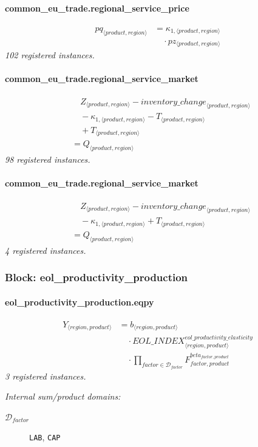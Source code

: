 \documentclass[11pt]{article}
\begin{document}
\paragraph{common\_eu\_trade.regional\_service\_price}
\begin{align*}
pq_{\langle product, region\rangle} &= \kappa_{1,\langle product, region\rangle}\\
&\quad {}\cdot pz_{\langle product, region\rangle}
\end{align*}
\noindent\emph{102 registered instances.}\par
\paragraph{common\_eu\_trade.regional\_service\_market}
\begin{align*}
&\quad Z_{\langle product, region\rangle} - {inventory\_change}_{\langle product, region\rangle}\\
&\quad {}- \kappa_{1,\langle product, region\rangle} - T_{\langle product, region\rangle}\\
&\quad {}+ T_{\langle product, region\rangle}\\
&= Q_{\langle product, region\rangle}
\end{align*}
\noindent\emph{98 registered instances.}\par
\paragraph{common\_eu\_trade.regional\_service\_market}
\begin{align*}
&\quad Z_{\langle product, region\rangle} - {inventory\_change}_{\langle product, region\rangle}\\
&\quad {}- \kappa_{1,\langle product, region\rangle} + T_{\langle product, region\rangle}\\
&= Q_{\langle product, region\rangle}
\end{align*}
\noindent\emph{4 registered instances.}\par
\subsubsection*{Block: eol\_productivity\_production}
\paragraph{eol\_productivity\_production.eqpy}
\begin{align*}
Y_{\langle region, product\rangle} &= b_{\langle region, product\rangle}\\
&\quad {}\cdot {EOL\_INDEX}_{\langle region, product\rangle}^{eol\_productivity\_elasticity}\\
&\quad {}\cdot \prod_{factor \in \mathcal{D}_{factor}} F_{factor,product}^{beta_{factor,product}}
\end{align*}
\noindent\emph{3 registered instances.}\par
\noindent\emph{Internal sum/product domains:}\par
\begin{description}
\item[\(\mathcal{D}_{factor}\)] \texttt{LAB}, \texttt{CAP}
\end{description}
\end{document}
